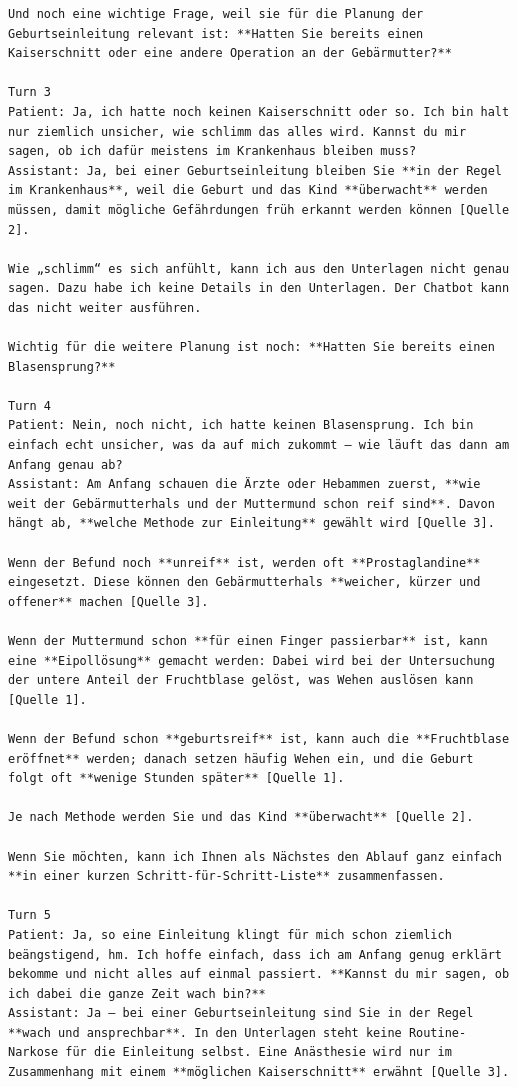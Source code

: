 \begin{Verbatim}[fontsize=\small,breaklines=true,breakanywhere=true]
Und noch eine wichtige Frage, weil sie für die Planung der Geburtseinleitung relevant ist: **Hatten Sie bereits einen Kaiserschnitt oder eine andere Operation an der Gebärmutter?**

Turn 3
Patient: Ja, ich hatte noch keinen Kaiserschnitt oder so. Ich bin halt nur ziemlich unsicher, wie schlimm das alles wird. Kannst du mir sagen, ob ich dafür meistens im Krankenhaus bleiben muss?
Assistant: Ja, bei einer Geburtseinleitung bleiben Sie **in der Regel im Krankenhaus**, weil die Geburt und das Kind **überwacht** werden müssen, damit mögliche Gefährdungen früh erkannt werden können [Quelle 2].

Wie „schlimm“ es sich anfühlt, kann ich aus den Unterlagen nicht genau sagen. Dazu habe ich keine Details in den Unterlagen. Der Chatbot kann das nicht weiter ausführen.

Wichtig für die weitere Planung ist noch: **Hatten Sie bereits einen Blasensprung?**

Turn 4
Patient: Nein, noch nicht, ich hatte keinen Blasensprung. Ich bin einfach echt unsicher, was da auf mich zukommt — wie läuft das dann am Anfang genau ab?
Assistant: Am Anfang schauen die Ärzte oder Hebammen zuerst, **wie weit der Gebärmutterhals und der Muttermund schon reif sind**. Davon hängt ab, **welche Methode zur Einleitung** gewählt wird [Quelle 3].

Wenn der Befund noch **unreif** ist, werden oft **Prostaglandine** eingesetzt. Diese können den Gebärmutterhals **weicher, kürzer und offener** machen [Quelle 3].

Wenn der Muttermund schon **für einen Finger passierbar** ist, kann eine **Eipollösung** gemacht werden: Dabei wird bei der Untersuchung der untere Anteil der Fruchtblase gelöst, was Wehen auslösen kann [Quelle 1].

Wenn der Befund schon **geburtsreif** ist, kann auch die **Fruchtblase eröffnet** werden; danach setzen häufig Wehen ein, und die Geburt folgt oft **wenige Stunden später** [Quelle 1].

Je nach Methode werden Sie und das Kind **überwacht** [Quelle 2].

Wenn Sie möchten, kann ich Ihnen als Nächstes den Ablauf ganz einfach **in einer kurzen Schritt-für-Schritt-Liste** zusammenfassen.

Turn 5
Patient: Ja, so eine Einleitung klingt für mich schon ziemlich beängstigend, hm. Ich hoffe einfach, dass ich am Anfang genug erklärt bekomme und nicht alles auf einmal passiert. **Kannst du mir sagen, ob ich dabei die ganze Zeit wach bin?**
Assistant: Ja — bei einer Geburtseinleitung sind Sie in der Regel **wach und ansprechbar**. In den Unterlagen steht keine Routine-Narkose für die Einleitung selbst. Eine Anästhesie wird nur im Zusammenhang mit einem **möglichen Kaiserschnitt** erwähnt [Quelle 3].


\end{Verbatim}

